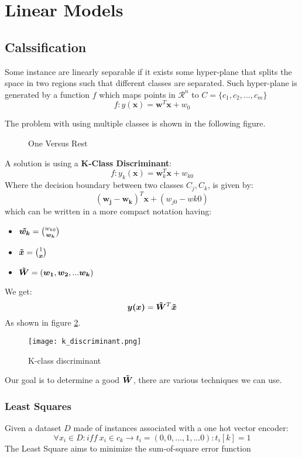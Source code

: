 
\section{Linear Models}

\subsection{Calssification}
Some instance are linearly separable if it exists some hyper-plane that splits the space in two regions such that different classes are separated. Such hyper-plane is generated by a function $f$ which maps points in $\mathcal{R}^n$ to $C=\lbrace c_1,c_2,...,c_m\rbrace$
\[f: y(\bm{x})=\bm{w}^T\bm{x}+w_0\]


The problem with using multiple classes is shown in the following figure.


\begin{figure}[H]
    \centering
    \qquad

\caption{One Versus Rest }
\label{fig:linear_problem}

\end{figure}


A solution is using a \textbf{K-Class Discriminant}:
\[f: y_k(\bm{x})=\bm{w}_k^T\bm{x}+w_{k0}\]
Where the decision boundary between two classes $C_j,C_k$, is given by:
\[(\bm{w_j}-\bm{w_k})^T\bm{x}+(w_{j0}-w{k0})\]
which can be written in a more compact notation having:
\begin{itemize}
\item $\bm{\tilde{w_k}}=\binom{w_{k0}}{\bm{w_k}}$
\item $\bm{\tilde{x}}=\binom{1}{\bm{x}}$
\item $\bm{\tilde{W}}=(\bm{w_1},\bm{w_2},...\bm{w_k})$
\end{itemize}
We get:
\[\bm{y(x)}=\bm{\tilde{W}}^T\bm{\tilde{x}}\]
As shown in figure \ref{fig:k_discriminant}.

\begin{figure}[H]
\texttt{[image: k\_discriminant.png]}
\caption{K-class discriminant}
\label{fig:k_discriminant}
\end{figure}

Our goal is to determine a good $\bm{\tilde{W}}$, there are various techniques we can use.

\subsubsection{Least Squares}
Given a dataset $D$ made of instances associated with a one hot vector encoder:
\[\forall x_i \in D: iff\ x_i \in c_k \rightarrow t_i=(0,0,...,1,...0): t_i[k]=1\]
The Least Square aims to minimize the sum-of-square error function


